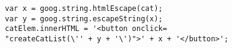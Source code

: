   


\begin{lstlisting}[language={}, caption={Mutation XSS attack code example}, label={lst-web-security}, float=htbp]
var x = goog.string.htmlEscape(cat);
var y = goog.string.escapeString(x);
catElem.innerHTML = '<button onclick=
"createCatList(\'' + y + '\')">' + x + '</button>';
\end{lstlisting}

